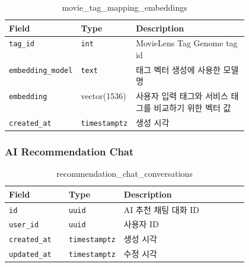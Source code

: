 \documentclass[11pt,a4paper]{article}
\renewcommand{\arraystretch}{1.18}
\begin{document}
\begin{table}[H]
\centering
\footnotesize
\setlength{\tabcolsep}{5pt}
\renewcommand{\arraystretch}{1.28}
\begin{tabularx}{\linewidth}{@{}>{\RaggedRight\arraybackslash}p{0.25\linewidth}>{\RaggedRight\arraybackslash}p{0.22\linewidth}>{\RaggedRight\arraybackslash}X@{}}
\toprule
\textbf{Field} & \textbf{Type} & \textbf{Description} \\
\midrule
\texttt{tag\_\allowbreak{}id} & \texttt{int} & MovieLens Tag Genome tag id \\
\texttt{embedding\_\allowbreak{}model} & \texttt{text} & 태그 벡터 생성에 사용한 모델명 \\
\texttt{embedding} & vector(1536) & 사용자 입력 태그와 서비스 태그를 비교하기 위한 벡터 값 \\
\texttt{created\_\allowbreak{}at} & \texttt{timestamptz} & 생성 시각 \\
\bottomrule
\end{tabularx}
\caption{movie\_tag\_mapping\_embeddings}
\end{table}

\hypertarget{ai-recommendation-chat-1}{%
\subsubsection{AI Recommendation Chat}\label{ai-recommendation-chat-1}}

\begin{table}[H]
\centering
\footnotesize
\setlength{\tabcolsep}{5pt}
\renewcommand{\arraystretch}{1.28}
\begin{tabularx}{\linewidth}{@{}>{\RaggedRight\arraybackslash}p{0.25\linewidth}>{\RaggedRight\arraybackslash}p{0.22\linewidth}>{\RaggedRight\arraybackslash}X@{}}
\toprule
\textbf{Field} & \textbf{Type} & \textbf{Description} \\
\midrule
\texttt{id} & \texttt{uuid} & AI 추천 채팅 대화 ID \\
\texttt{user\_\allowbreak{}id} & \texttt{uuid} & 사용자 ID \\
\texttt{created\_\allowbreak{}at} & \texttt{timestamptz} & 생성 시각 \\
\texttt{updated\_\allowbreak{}at} & \texttt{timestamptz} & 수정 시각 \\
\bottomrule
\end{tabularx}
\caption{recommendation\_chat\_conversations}
\end{table}
\end{document}
